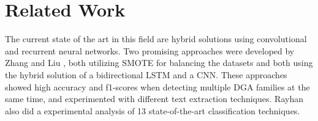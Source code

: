 \documentclass[a4paper, 12pt]{article}
\begin{document}
\section{Related Work}
The current state of the art in this field are hybrid solutions using convolutional and recurrent
neural networks. Two promising approaches were developed by Zhang \cite{zhang_detection_2019} and
Liu \cite{liu_detection_2020}, both utilizing SMOTE for balancing the datasets and both using the
hybrid solution of a bidirectional LSTM and a CNN. These approaches showed high accuracy and
f1-scores when detecting multiple DGA families at the same time, and experimented with different
text extraction techniques.
Rayhan \cite{rayhan_experimental_2020} also did a experimental analysis of 13 state-of-the-art
classification techniques. 

\clearpage

\printbibliography
\end{document}
